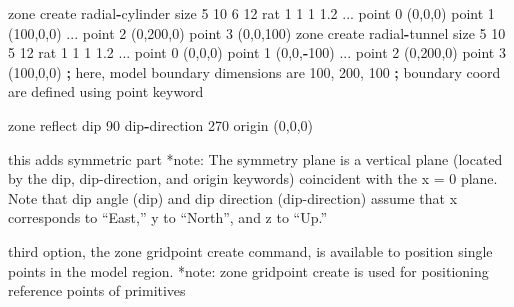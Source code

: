 \documentclass[a4paper, nobind]{templates/ociamthesis}
\newenvironment{Shaded}{\begin{snugshade}}{\end{snugshade}}
\newcommand{\DecValTok}[1]{\textcolor[rgb]{0.00,0.00,0.81}{#1}}
\newcommand{\FloatTok}[1]{\textcolor[rgb]{0.00,0.00,0.81}{#1}}
\newcommand{\NormalTok}[1]{#1}
\newcommand{\OperatorTok}[1]{\textcolor[rgb]{0.81,0.36,0.00}{\textbf{#1}}}
\renewenvironment{Shaded}
{
  \vspace{10pt}%
  \begin{snugshade}%
}{%
  \end{snugshade}%
  \vspace{8pt}%
}
\begin{document}
\begin{Shaded}
\begin{Highlighting}[]
\NormalTok{zone create radial}\OperatorTok{{-}}\NormalTok{cylinder size }\DecValTok{5} \DecValTok{10} \DecValTok{6} \DecValTok{12}\NormalTok{ rat }\DecValTok{1} \DecValTok{1} \DecValTok{1} \FloatTok{1.2}\NormalTok{ ...}
\NormalTok{                           point }\DecValTok{0}\NormalTok{ (}\DecValTok{0}\NormalTok{,}\DecValTok{0}\NormalTok{,}\DecValTok{0}\NormalTok{) point }\DecValTok{1}\NormalTok{ (}\DecValTok{100}\NormalTok{,}\DecValTok{0}\NormalTok{,}\DecValTok{0}\NormalTok{) ...}
\NormalTok{                           point }\DecValTok{2}\NormalTok{ (}\DecValTok{0}\NormalTok{,}\DecValTok{200}\NormalTok{,}\DecValTok{0}\NormalTok{) point }\DecValTok{3}\NormalTok{ (}\DecValTok{0}\NormalTok{,}\DecValTok{0}\NormalTok{,}\DecValTok{100}\NormalTok{)}
\NormalTok{zone create radial}\OperatorTok{{-}}\NormalTok{tunnel size }\DecValTok{5} \DecValTok{10} \DecValTok{5} \DecValTok{12}\NormalTok{ rat }\DecValTok{1} \DecValTok{1} \DecValTok{1} \FloatTok{1.2}\NormalTok{ ...}
\NormalTok{                          point }\DecValTok{0}\NormalTok{ (}\DecValTok{0}\NormalTok{,}\DecValTok{0}\NormalTok{,}\DecValTok{0}\NormalTok{) point }\DecValTok{1}\NormalTok{ (}\DecValTok{0}\NormalTok{,}\DecValTok{0}\NormalTok{,}\OperatorTok{{-}}\DecValTok{100}\NormalTok{) ...}
\NormalTok{                          point }\DecValTok{2}\NormalTok{ (}\DecValTok{0}\NormalTok{,}\DecValTok{200}\NormalTok{,}\DecValTok{0}\NormalTok{) point }\DecValTok{3}\NormalTok{ (}\DecValTok{100}\NormalTok{,}\DecValTok{0}\NormalTok{,}\DecValTok{0}\NormalTok{)}
\OperatorTok{;}\NormalTok{ here, model boundary dimensions are }\DecValTok{100}\NormalTok{, }\DecValTok{200}\NormalTok{, }\DecValTok{100}
\OperatorTok{;}\NormalTok{ boundary coord are defined using point keyword}

\NormalTok{zone reflect dip }\DecValTok{90}\NormalTok{ dip}\OperatorTok{{-}}\NormalTok{direction }\DecValTok{270}\NormalTok{ origin (}\DecValTok{0}\NormalTok{,}\DecValTok{0}\NormalTok{,}\DecValTok{0}\NormalTok{) }
\end{Highlighting}
\end{Shaded}

this adds symmetric part
*note: The symmetry plane is a vertical plane (located by the dip, dip-direction, and origin keywords) coincident with the x = 0 plane. Note that dip angle (dip) and dip direction (dip-direction) assume that x corresponds to ``East,'' y to ``North'', and z to ``Up.''

third option, the zone gridpoint create command, is available to position single points in the model region.
*note: zone gridpoint create is used for positioning reference points of primitives
\end{document}
